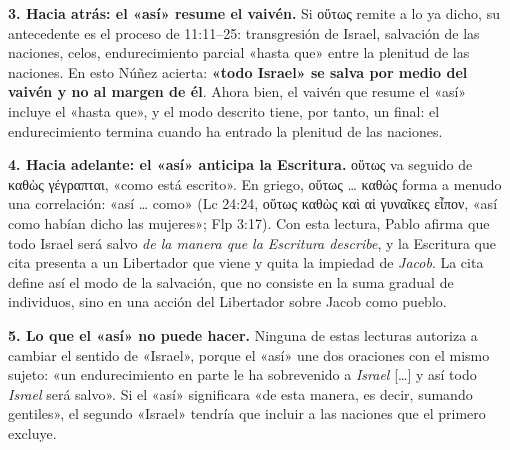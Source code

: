 \documentclass[11pt,letterpaper]{article}
\newcommand{\grc}[1]{\foreignlanguage{ancientgreek}{#1}}
\newcommand{\destacar}[1]{\textbf{\textcolor{ladrillo}{#1}}}
\begin{document}
\textbf{3. Hacia atrás: el «así» resume el vaivén.} Si \grc{οὕτως} remite a lo ya dicho, su antecedente es el proceso de 11:11--25: transgresión de Israel, salvación de las naciones, celos, endurecimiento parcial «hasta que» entre la plenitud de las naciones. En esto Núñez acierta: \destacar{«todo Israel» se salva por medio del vaivén y no al margen de él}. Ahora bien, el vaivén que resume el «así» incluye el «hasta que», y el modo descrito tiene, por tanto, un final: el endurecimiento termina cuando ha entrado la plenitud de las naciones.

\textbf{4. Hacia adelante: el «así» anticipa la Escritura.} \grc{οὕτως} va seguido de \grc{καθὼς γέγραπται}, «como está escrito». En griego, \grc{οὕτως … καθώς} forma a menudo una correlación: «así \ldots{} como» (Lc 24:24, \grc{οὕτως καθὼς καὶ αἱ γυναῖκες εἶπον}, «así como habían dicho las mujeres»; Flp 3:17). Con esta lectura, Pablo afirma que todo Israel será salvo \emph{de la manera que la Escritura describe}, y la Escritura que cita presenta a un Libertador que viene y quita la impiedad de \emph{Jacob}. La cita define así el modo de la salvación, que no consiste en la suma gradual de individuos, sino en una acción del Libertador sobre Jacob como pueblo.

\textbf{5. Lo que el «así» no puede hacer.} Ninguna de estas lecturas autoriza a cambiar el sentido de «Israel», porque el «así» une dos oraciones con el mismo sujeto: «un endurecimiento en parte le ha sobrevenido a \emph{Israel} [\ldots] y así todo \emph{Israel} será salvo». Si el «así» significara «de esta manera, es decir, sumando gentiles», el segundo «Israel» tendría que incluir a las naciones que el primero excluye.
\end{document}

